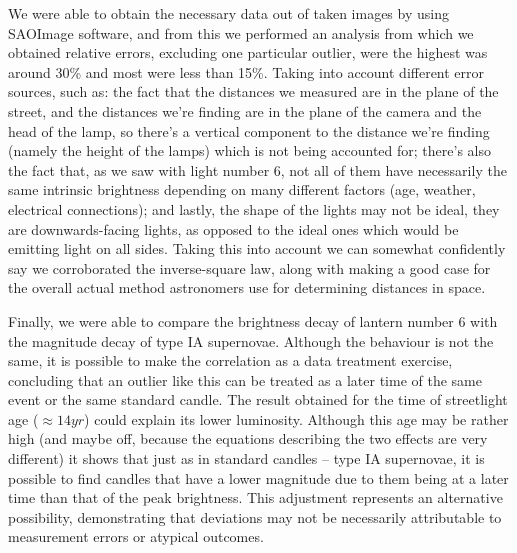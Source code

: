 \documentclass[aps,rmp,twocolumn,nofootinbib,superscriptaddress,floatfix,longbibliography]{revtex4-2}
\begin{document}
    We were able to obtain the necessary data out of taken images by using SAOImage software, and from this we performed an analysis from which we obtained relative errors, excluding one particular outlier, were the highest was around 30\% and most were less than 15\%. Taking into account different error sources, such as: the fact that the distances we measured are in the plane of the street, and the distances we're finding are in the plane of the camera and the head of the lamp, so there's a vertical component to the distance we're finding (namely the height of the lamps) which is not being accounted for; there's also the fact that, as we saw with light number 6, not all of them have necessarily the same intrinsic brightness depending on many different factors (age, weather, electrical connections); and lastly, the shape of the lights may not be ideal, they are downwards-facing lights, as opposed to the ideal ones which would be emitting light on all sides. Taking this into account we can somewhat confidently say we corroborated the inverse-square law, along with making a good case for the overall actual method astronomers use for determining distances in space.

    Finally, we were able to compare the brightness decay of lantern number 6 with the magnitude decay of type IA supernovae. Although the behaviour is not the same, it is possible to make the correlation as a data treatment exercise, concluding that an outlier like this can be treated as a later time of the same event or the same standard candle. The result obtained for the time of streetlight age ($\approx 14yr$) could explain its lower luminosity. Although this age may be rather high (and maybe off, because the equations describing the two effects are very different) it shows that just as in standard candles -- type IA supernovae, it is possible to find candles that have a lower magnitude due to them being at a later time than that of the peak brightness. This adjustment represents an alternative possibility, demonstrating that deviations may not be necessarily attributable to measurement errors or atypical outcomes.



\end{document}
